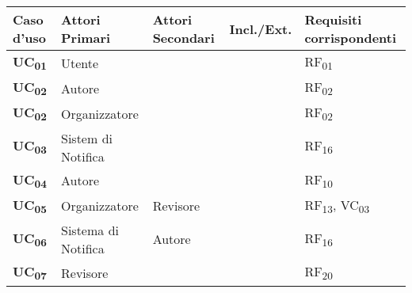 \begin{tabular}{|p{2cm}|p{2cm}|p{2cm}|p{2cm}|p{2cm}|}
  \hline
  \rowcolor{SkyBlue}
  Caso d'uso & Attori Primari & Attori Secondari & Incl./Ext. & Requisiti corrispondenti \\
  \hline
  \hline
  \textbf{UC\textsubscript{01}}& Utente & & & RF\textsubscript{01} \\
  \hline
  \textbf{UC\textsubscript{02}} & Autore & & & RF\textsubscript{02} \\
  \hline
  \textbf{UC\textsubscript{02}} & Organizzatore & & & RF\textsubscript{02} \\
  \hline
  \textbf{UC\textsubscript{03}} & Sistem di Notifica & & & RF\textsubscript{16} \\
  \hline
  \textbf{UC\textsubscript{04}} & Autore & & & RF\textsubscript{10} \\
  \hline
  \textbf{UC\textsubscript{05}} & Organizzatore & Revisore & & RF\textsubscript{13}, VC\textsubscript{03} \\
  \hline
  \textbf{UC\textsubscript{06}} & Sistema di Notifica & Autore & & RF\textsubscript{16}\\
  \hline
  \textbf{UC\textsubscript{07}} & Revisore & & & RF\textsubscript{20} \\
  \hline
\end{tabular}
